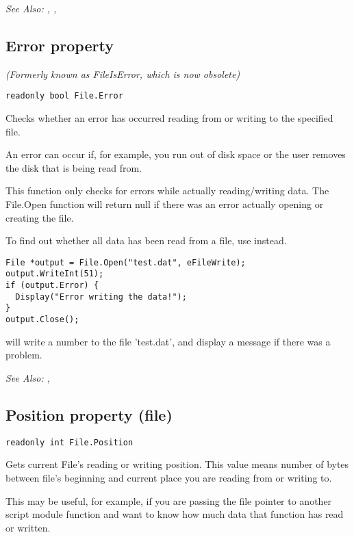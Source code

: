 \it{See Also:} , ,


\subsection{Error property}\label{File.Error}%

\it{(Formerly known as FileIsError, which is now obsolete)}

\begin{verbatim}
readonly bool File.Error
\end{verbatim}
Checks whether an error has occurred reading from or writing to the specified file.

An error can occur if, for example, you run out of disk space or the user removes the
disk that is being read from.

This function only checks for errors while actually reading/writing data. The File.Open
function will return null if there was an error actually opening or creating the file.

To find out whether all data has been read from a file, use  instead.

\begin{verbatim}
File *output = File.Open("test.dat", eFileWrite);
output.WriteInt(51);
if (output.Error) {
  Display("Error writing the data!");
}
output.Close();
\end{verbatim}
will write a number to the file 'test.dat', and display a message if there was a problem.

\it{See Also:} , 


\subsection{Position property (file)}\label{File.Position}%

\begin{verbatim}
readonly int File.Position
\end{verbatim}
Gets current File's reading or writing position. This value means number of bytes between file's
beginning and current place you are reading from or writing to.

This may be useful, for example, if you are passing the file pointer to another script module
function and want to know how much data that function has read or written.

